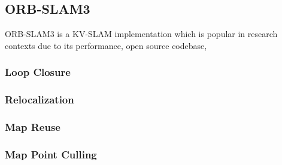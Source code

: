 \subsection{ORB-SLAM3}

ORB-SLAM3 is a KV-SLAM implementation which is popular in research contexts due to its performance, open source codebase, 

\subsubsection{Loop Closure}
\subsubsection{Relocalization}
\subsubsection{Map Reuse}
\subsubsection{Map Point Culling}